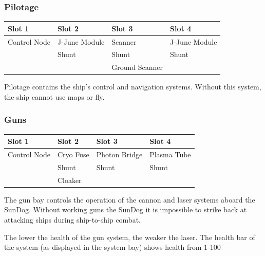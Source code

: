 \begin{itemize}
\subsubsection{Pilotage}

\begin{tabular}{ | p{2.5cm} | p{2.5cm} | p{2.5cm} | p{2.5cm} | }
\hline
Slot 1 & Slot 2 & Slot 3 & Slot 4 \\ \hline
Control Node & J-Junc Module & Scanner & J-Junc Module \\
& Shunt & Shunt & Shunt \\
& & Ground Scanner & \\
\hline
\end{tabular}

Pilotage contains the ship's control and navigation systems. Without this system, the ship cannot use maps or fly.

\subsubsection{Guns}

\begin{tabular}{ | p{2.5cm} | p{2.5cm} | p{2.5cm} | p{2.5cm} | }
\hline
Slot 1 & Slot 2 & Slot 3 & Slot 4 \\ \hline
Control Node & Cryo Fuse & Photon Bridge & Plasma Tube \\
& Shunt & Shunt & Shunt \\
& Cloaker & & \\
\hline
\end{tabular}

The gun bay controls the operation of the cannon and laser systems aboard
the SunDog.  Without working guns the SunDog it is impossible to strike
back at attacking ships during ship-to-ship combat.

The lower the health of the gun system, the weaker the laser. The health bar of the system (as displayed in the system bay) shows health from 1-100%


\end{itemize}
